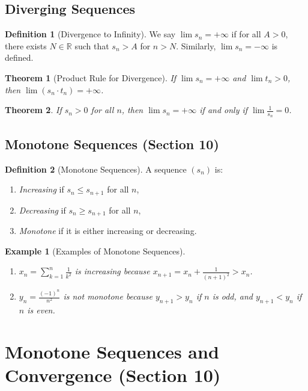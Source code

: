 \documentclass[9pt]{article}
\theoremstyle{definition}
\newtheorem{definition}{Definition}
\theoremstyle{plain}
\newtheorem{theorem}{Theorem}
\newtheorem{example}{Example}
\begin{document}
\subsection*{Diverging Sequences}
\begin{definition}[Divergence to Infinity]
We say $ \lim s_n = +\infty $ if for all $ A > 0 $, there exists $ N \in \mathbb{R} $ such that $ s_n > A $ for $ n > N $. Similarly, $ \lim s_n = -\infty $ is defined.
\end{definition}

\begin{theorem}[Product Rule for Divergence]
If $ \lim s_n = +\infty $ and $ \lim t_n > 0 $, then $ \lim (s_n \cdot t_n) = +\infty $.
\end{theorem}

\begin{theorem}
If $ s_n > 0 $ for all $ n $, then $ \lim s_n = +\infty $ if and only if $ \lim \frac{1}{s_n} = 0 $.
\end{theorem}

\subsection*{Monotone Sequences (Section 10)}
\begin{definition}[Monotone Sequences]
A sequence $ (s_n) $ is:
\begin{enumerate}
    \item \emph{Increasing} if $ s_n \leq s_{n+1} $ for all $ n $,
    \item \emph{Decreasing} if $ s_n \geq s_{n+1} $ for all $ n $,
    \item \emph{Monotone} if it is either increasing or decreasing.
\end{enumerate}
\end{definition}

\begin{example}[Examples of Monotone Sequences]

\begin{enumerate}
    \item $ x_n = \sum_{k=1}^n \frac{1}{k^2} $ is increasing because $ x_{n+1} = x_n + \frac{1}{(n+1)^2} > x_n $.
    \item $ y_n = \frac{(-1)^n}{n^2} $ is not monotone because $ y_{n+1} > y_n $ if $ n $ is odd, and $ y_{n+1} < y_n $ if $ n $ is even.
\end{enumerate}
\end{example}
\section*{Monotone Sequences and Convergence (Section 10)}
\end{document}
